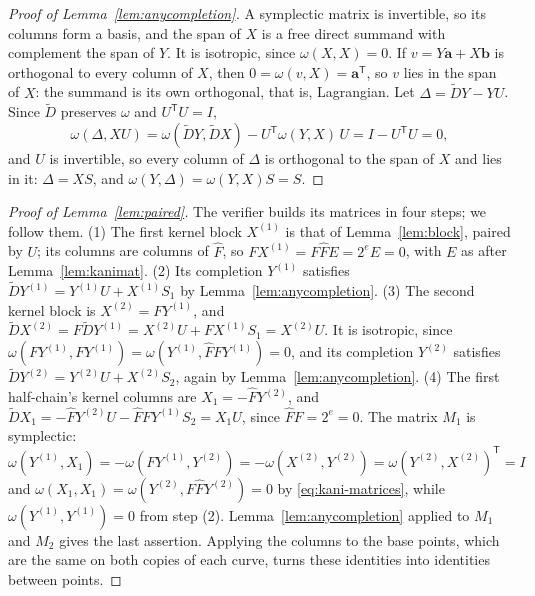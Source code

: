 \documentclass[version=preprint]{iacrcc}
\begin{document}
    \begin{proof}[Proof of Lemma~\ref{lem:anycompletion}]
        A symplectic matrix is invertible, so its columns form a basis, and the
        span of $X$ is a free direct summand with complement the span of $Y$. It
        is isotropic, since $\omega(X, X) = 0$. If $v = Y\mathbf a + X\mathbf b$ is
        orthogonal to every column of $X$, then $0 = \omega(v, X) = \mathbf
        a^{\mathsf T}$, so $v$ lies in the span of $X$: the summand is its own
        orthogonal, that is, Lagrangian. Let $\Delta = \tilde D Y - YU$. Since
        $\tilde D$ preserves $\omega$ and $U^{\mathsf T} U = I$,
        \[
        \omega(\Delta, XU) = \omega(\tilde D Y, \tilde D X) - U^{\mathsf T}
        \omega(Y, X)\, U = I - U^{\mathsf T} U = 0,
        \]
        and $U$ is invertible, so every column of $\Delta$ is orthogonal to the
        span of $X$ and lies in it: $\Delta = XS$, and $\omega(Y, \Delta) =
        \omega(Y, X) S = S$.
    \end{proof}

    \begin{proof}[Proof of Lemma~\ref{lem:paired}]
        The verifier builds its matrices in four steps; we follow them.
        (1) The first kernel block $X^{(1)}$ is that of Lemma~\ref{lem:block},
        paired by $U$; its columns are columns of $\widehat F$, so $F X^{(1)} =
        F \widehat F E = 2^e E = 0$, with $E$ as after Lemma~\ref{lem:kanimat}.
        (2) Its completion $Y^{(1)}$ satisfies $\tilde D Y^{(1)} = Y^{(1)} U +
        X^{(1)} S_1$ by Lemma~\ref{lem:anycompletion}.
        (3) The second kernel block is $X^{(2)} = F Y^{(1)}$, and
        $\tilde D X^{(2)} = F \tilde D Y^{(1)} = X^{(2)} U + F X^{(1)} S_1 =
        X^{(2)} U$. It is isotropic, since $\omega(F Y^{(1)}, F Y^{(1)}) =
        \omega(Y^{(1)}, \widehat F F Y^{(1)}) = 0$, and its completion $Y^{(2)}$
        satisfies $\tilde D Y^{(2)} = Y^{(2)} U + X^{(2)} S_2$, again by
        Lemma~\ref{lem:anycompletion}.
        (4) The first half-chain's kernel columns are $X_1 = -\widehat F
        Y^{(2)}$, and $\tilde D X_1 = -\widehat F Y^{(2)} U - \widehat F F
        Y^{(1)} S_2 = X_1 U$, since $\widehat F F = 2^e = 0$. The matrix $M_1$ is
        symplectic: $\omega(Y^{(1)}, X_1) = -\omega(F Y^{(1)}, Y^{(2)}) =
        -\omega(X^{(2)}, Y^{(2)}) = \omega(Y^{(2)}, X^{(2)})^{\mathsf T} = I$ and
        $\omega(X_1, X_1) = \omega(Y^{(2)}, F \widehat F Y^{(2)}) = 0$ by
        \eqref{eq:kani-matrices}, while $\omega(Y^{(1)}, Y^{(1)}) = 0$ from step
        (2). Lemma~\ref{lem:anycompletion} applied to $M_1$ and $M_2$ gives the
        last assertion. Applying the columns to the base points, which are the
        same on both copies of each curve, turns these identities into identities
        between points.
    \end{proof}
\end{document}
